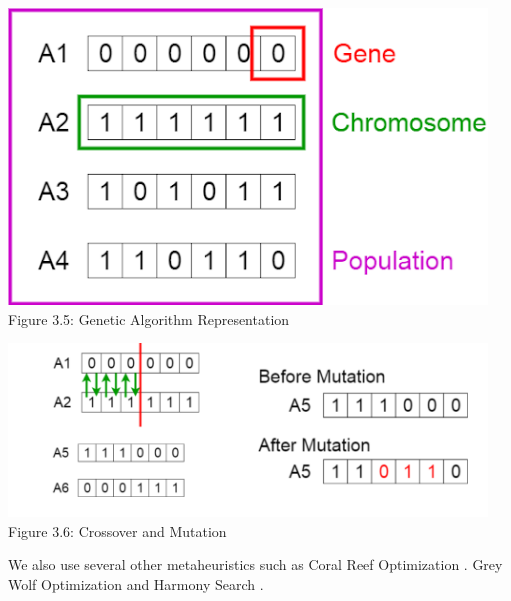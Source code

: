 \begin{center}
   \includegraphics[width=5in]{images/3.5.png} 
   \\\fontsize{11pt}{24pt} Figure 3.5: Genetic Algorithm Representation
\end{center}
			


\begin{center}
   \includegraphics[width=5in]{images/3.6.png} 
   \\\fontsize{11pt}{24pt} Figure 3.6: Crossover and Mutation
\end{center}


We also use several other metaheuristics such as Coral Reef Optimization  \cite{26}. Grey Wolf Optimization  \cite{12} and Harmony Search  \cite{27}.
